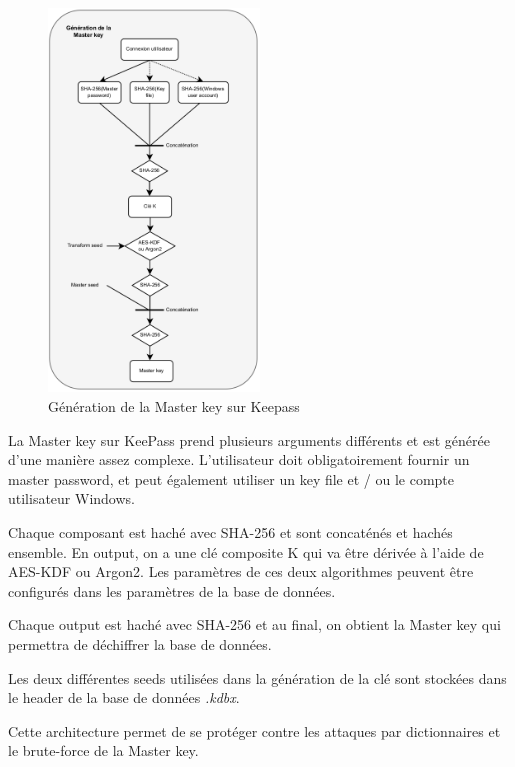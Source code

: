  \newpage

\begin{figure} 
	\includegraphics[width=0.5\textwidth]{images/keepass_generation_key.png}
	\caption{Génération de la Master key sur Keepass \label{schema_keepass}}
\end{figure}

La Master key sur KeePass prend plusieurs arguments différents et est générée d'une manière assez complexe. L'utilisateur doit obligatoirement fournir un master password, et peut également utiliser un key file et / ou le compte utilisateur Windows. 

Chaque composant est haché avec SHA-256 et sont concaténés et hachés ensemble. En output, on a une clé composite K qui va être dérivée à l'aide de AES-KDF ou Argon2. Les paramètres de ces deux algorithmes peuvent être configurés dans les paramètres de la base de données.

Chaque output est haché avec SHA-256 et au final, on obtient la Master key qui permettra de déchiffrer la base de données.

Les deux différentes seeds utilisées dans la génération de la clé sont stockées dans le header de la base de données \textit{.kdbx}.

Cette architecture permet de se protéger contre les attaques par dictionnaires et le brute-force de la Master key.
\newline\newline
